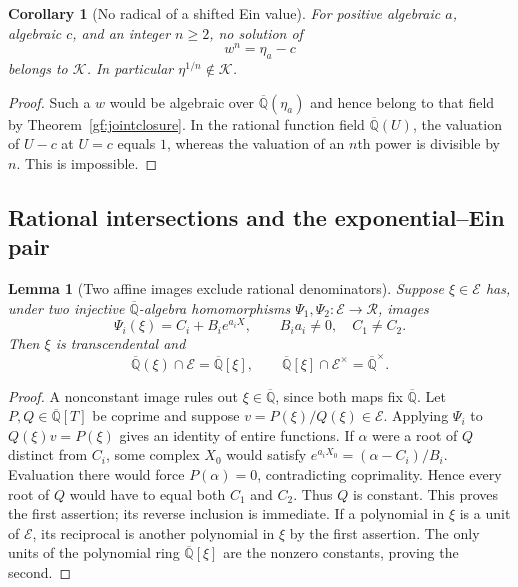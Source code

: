 \documentclass[11pt,a4paper]{article}
\numberwithin{equation}{section}
\newtheorem{lemma}[theorem]{Lemma}
\newtheorem{corollary}[theorem]{Corollary}
\theoremstyle{definition}
\theoremstyle{remark}
\newcommand{\A}{\overline{\mathbb Q}}
\newcommand{\Er}{\mathcal E}
\newcommand{\K}{\mathcal K}
\begin{document}
\begin{corollary}[No radical of a shifted Ein value]\label{gf:Ein-radicals}
For positive algebraic $a$, algebraic $c$, and an integer $n\ge2$, no
solution of
\[
 w^n=\eta_a-c
\]
belongs to $\K$.  In particular $\eta^{1/n}\notin\K$.
\end{corollary}
\begin{proof}
Such a $w$ would be algebraic over $\A(\eta_a)$ and hence belong to
that field by Theorem~\ref{gf:jointclosure}.  In the rational function
field $\A(U)$, the valuation of $U-c$ at $U=c$ equals $1$, whereas
the valuation of an $n$th power is divisible by $n$.  This is impossible.
\end{proof}

\subsection{Rational intersections and the exponential--Ein pair}
\label{gf:intersections}

\begin{lemma}[Two affine images exclude rational denominators]
\label{gf:two-centers-ring}
Suppose $\xi\in\Er$ has, under two injective $\A$-algebra
homomorphisms $\Psi_1,\Psi_2:\Er\to\mathcal R$, images
\[
 \Psi_i(\xi)=C_i+B_i e^{a_iX},\qquad
 B_i a_i\ne0,\quad C_1\ne C_2.
\]
Then $\xi$ is transcendental and
\begin{equation}\label{gf:ring-intersection-general}
 \A(\xi)\cap\Er=\A[\xi],\qquad
 \A[\xi]\cap\Er^\times=\A^\times.
\end{equation}
\end{lemma}
\begin{proof}
A nonconstant image rules out $\xi\in\A$, since both maps fix $\A$.
Let $P,Q\in\A[T]$ be coprime and suppose
$v=P(\xi)/Q(\xi)\in\Er$.  Applying $\Psi_i$ to
$Q(\xi)v=P(\xi)$ gives an identity of entire functions.  If $\alpha$
were a root of $Q$ distinct from $C_i$, some complex $X_0$ would
satisfy $e^{a_iX_0}=(\alpha-C_i)/B_i$.  Evaluation there would force
$P(\alpha)=0$, contradicting coprimality.  Hence every root of $Q$
would have to equal both $C_1$ and $C_2$.  Thus $Q$ is constant.
This proves the first assertion; its reverse inclusion is immediate.
If a polynomial in $\xi$ is a unit of $\Er$, its reciprocal is another
polynomial in $\xi$ by the first assertion.  The only units of the
polynomial ring $\A[\xi]$ are the nonzero constants, proving the second.
\end{proof}
\end{document}

